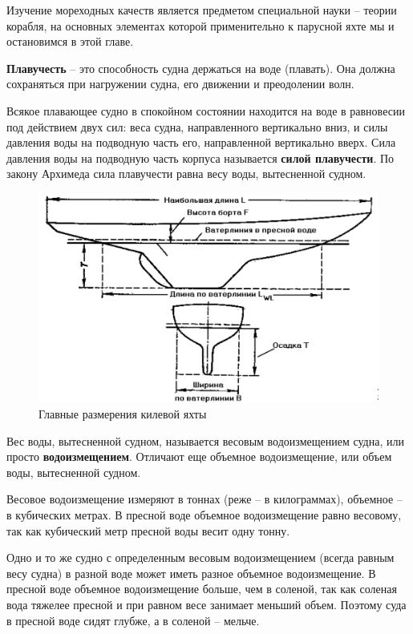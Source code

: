 \documentclass[a4paper, 12pt, twoside, final]{scrbook}
\begin{document}
Изучение мореходных качеств является предметом специальной науки \--- теории корабля, на основных элементах которой применительно к парусной яхте мы и остановимся в этой главе.

\textbf{Плавучесть} \--- это способность судна держаться на воде (плавать). Она должна сохраняться при нагружении судна, его движении и преодолении волн.

Всякое плавающее судно в спокойном состоянии находится на воде в равновесии под действием двух сил: веса судна, направленного вертикально вниз, и силы давления воды на подводную часть его, направленной вертикально вверх. Сила давления воды на подводную часть корпуса называется \textbf{силой плавучести}. По закону Архимеда сила плавучести равна весу воды, вытесненной судном.

\begin{figure}[htbp]
   \centering
   \includegraphics{pics/76_Glavnye_razmereniz} %
   \caption{Главные размерения килевой яхты}
   \label{fig:76}
\end{figure}

Вес воды, вытесненной судном, называется весовым водоизмещением судна, или просто \textbf{водоизмещением}. Отличают еще объемное водоизмещение, или объем воды, вытесненной судном.

Весовое водоизмещение измеряют в тоннах (реже \--- в килограммах), объемное \--- в кубических метрах. В пресной воде объемное водоизмещение равно весовому, так как кубический метр пресной воды весит одну тонну.

Одно и то же судно с определенным весовым водоизмещением (всегда равным весу судна) в разной воде может иметь разное объемное водоизмещение. В пресной воде объемное водоизмещение больше, чем в соленой, так как соленая вода тяжелее пресной и при равном весе занимает меньший объем. Поэтому суда в пресной воде сидят глубже, а в соленой \--- мельче.
\end{document}
